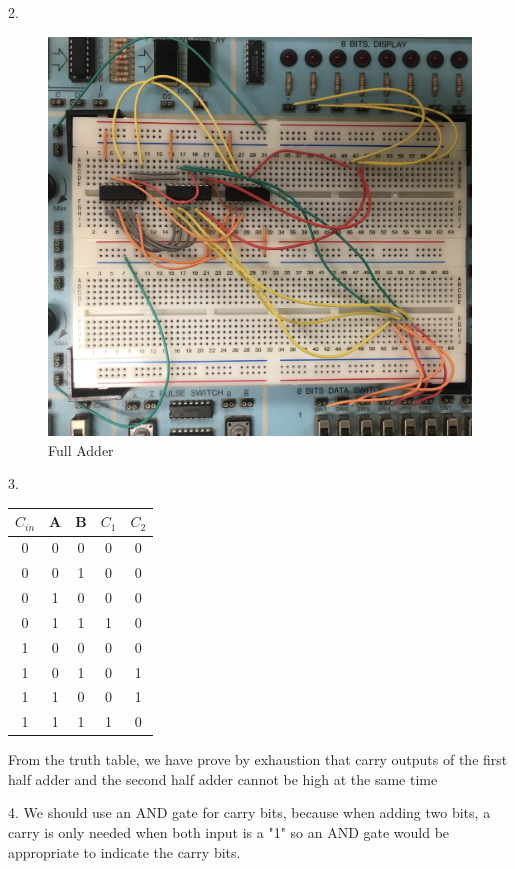 \documentclass[11pt]{article}
\begin{document}
2.
\begin{figure}
	\centering
	\includegraphics[width=\textwidth,angle=90]{"full_adder"}
	\caption{Full Adder}
\end{figure}

3.
\begin{center}
	\begin{tabular}{c|c|c||c|c}
		$C_{in}$ & A & B & $C_{1}$ & $C_{2}$ \\
		\midrule
		0 & 0 & 0 & 0 & 0 \\
		0 & 0 & 1 & 0 & 0 \\
		0 & 1 & 0 & 0 & 0 \\
		0 & 1 & 1 & 1 & 0 \\
		\midrule
		1 & 0 & 0 & 0 & 0 \\
		1 & 0 & 1 & 0 & 1 \\
		1 & 1 & 0 & 0 & 1 \\
		1 & 1 & 1 & 1 & 0 \\
		\bottomrule
	\end{tabular}
	
\end{center}
From the truth table, we have prove by exhaustion that carry outputs of the first half adder and the second half adder cannot be high at the same time

4. We should use an AND gate for carry bits, because when adding two bits, a carry is only needed when both input is a "1" so an AND gate would be appropriate to indicate the carry bits.
\end{document}
